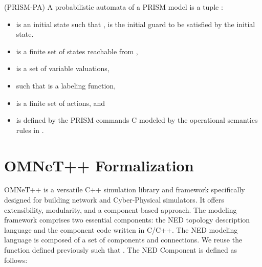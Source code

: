 \begin{mydef} \label{def:prismpa}\normalfont (PRISM-PA) A probabilistic automata of a PRISM model  is a tuple  :
\begin{itemize}

	\item {} is an initial state such that ,  is the initial guard to be satisfied by the initial state.
 
	\item {} is a finite set of states reachable from ,

 	\item {} is a set of variable valuations,
  
	\item {} such that \emath{[[g(X)]]=\top} is a labeling function,
 
	\item \emath{\Sigma}  is a finite set of actions, and  

    \item \emath{\delta} is deﬁned by the PRISM commands C modeled by the operational semantics rules in .
\end{itemize}
\end{mydef}


\section{OMNeT++ Formalization }
OMNeT++ \cite{omnet2008} is a versatile C++ simulation library and framework specifically designed for building network and Cyber-Physical simulators. It offers extensibility, modularity, and a component-based approach. The modeling framework comprises two essential components: the NED topology description language and the component code written in C/C++. The NED modeling language is composed of a set of components and connections. We reuse the function  defined previously such that . The NED Component is defined as follows: 

